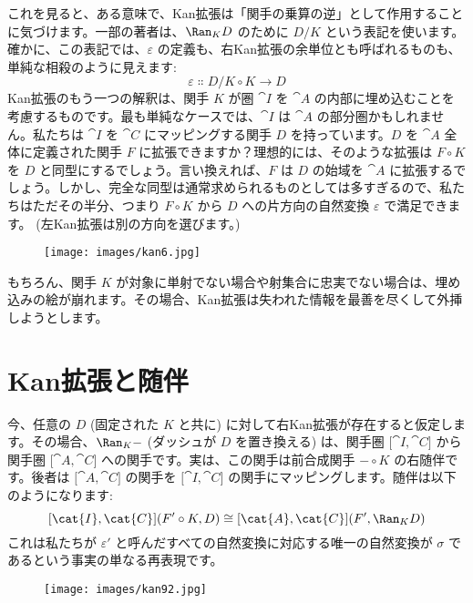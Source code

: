 \noindent
これを見ると、ある意味で、Kan拡張は「関手の乗算の逆」として作用することに気づけます。一部の著者は、$\Ran_{K}D$ のために $D/K$ という表記を使います。確かに、この表記では、$\varepsilon$ の定義も、右Kan拡張の余単位とも呼ばれるものも、単純な相殺のように見えます:
\[\varepsilon \Colon D/K \circ K \to D\]
Kan拡張のもう一つの解釈は、関手 $K$ が圏 $\cat{I}$ を $\cat{A}$ の内部に埋め込むことを考慮するものです。最も単純なケースでは、$\cat{I}$ は $\cat{A}$ の部分圏かもしれません。私たちは $\cat{I}$ を $\cat{C}$ にマッピングする関手 $D$ を持っています。$D$ を $\cat{A}$ 全体に定義された関手 $F$ に拡張できますか？理想的には、そのような拡張は $F \circ K$ を $D$ と同型にするでしょう。言い換えれば、$F$ は $D$ の始域を $\cat{A}$ に拡張するでしょう。しかし、完全な同型は通常求められるものとしては多すぎるので、私たちはただその半分、つまり $F \circ K$ から $D$ への片方向の自然変換 $\varepsilon$ で満足できます。 (左Kan拡張は別の方向を選びます。) 

\begin{figure}[H]
  \centering
  \texttt{[image: images/kan6.jpg]}
\end{figure}

\noindent
もちろん、関手 $K$ が対象に単射でない場合や射集合に忠実でない場合は、埋め込みの絵が崩れます。その場合、Kan拡張は失われた情報を最善を尽くして外挿しようとします。

\section{Kan拡張と随伴}

今、任意の $D$  (固定された $K$ と共に) に対して右Kan拡張が存在すると仮定します。その場合、$\Ran_{K}-$ (ダッシュが $D$ を置き換える) は、関手圏 ${[}\cat{I}, \cat{C}{]}$ から関手圏 ${[}\cat{A}, \cat{C}{]}$ への関手です。実は、この関手は前合成関手 $- \circ K$ の右随伴です。後者は ${[}\cat{A}, \cat{C}{]}$ の関手を ${[}\cat{I}, \cat{C}{]}$ の関手にマッピングします。随伴は以下のようになります:
\[[\cat{I}, \cat{C}](F' \circ K, D) \cong [\cat{A}, \cat{C}](F', \Ran_{K}D)\]
これは私たちが $\varepsilon'$ と呼んだすべての自然変換に対応する唯一の自然変換が $\sigma$ であるという事実の単なる再表現です。

\begin{figure}[H]
  \centering
  \texttt{[image: images/kan92.jpg]}
\end{figure}

